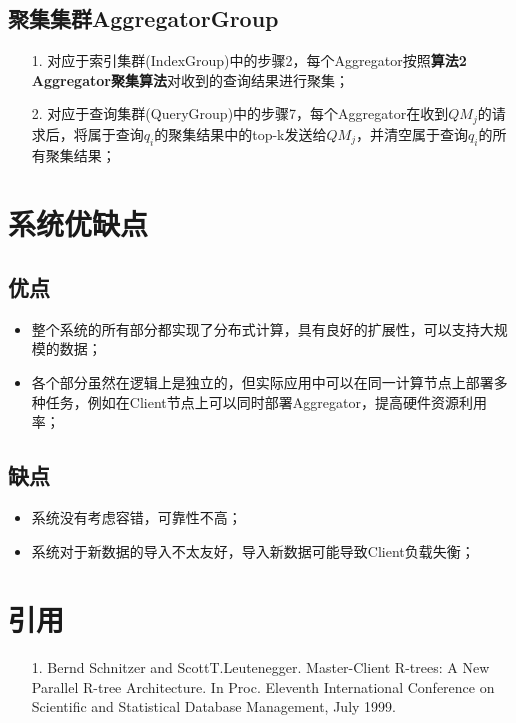 \documentclass{elegantpaper}
\begin{document}
\subsection{聚集集群AggregatorGroup}
\begin{itemize}
    \item[1.] 对应于索引集群(IndexGroup)中的步骤2，每个Aggregator按照{\bfseries 算法2 Aggregator聚集算法}对收到的查询结果进行聚集；
    \item[2.] 对应于查询集群(QueryGroup)中的步骤7，每个Aggregator在收到$QM_j$的请求后，将属于查询$q_i$的聚集结果中的top-k发送给$QM_j$，并清空属于查询$q_i$的所有聚集结果；
\end{itemize}

\section{系统优缺点}

\subsection{优点}

\begin{itemize}

    \item 整个系统的所有部分都实现了分布式计算，具有良好的扩展性，可以支持大规模的数据；
    
    \item 各个部分虽然在逻辑上是独立的，但实际应用中可以在同一计算节点上部署多种任务，例如在Client节点上可以同时部署Aggregator，提高硬件资源利用率；
    
\end{itemize}

\subsection{缺点}

\begin{itemize}

    \item 系统没有考虑容错，可靠性不高；

    \item 系统对于新数据的导入不太友好，导入新数据可能导致Client负载失衡；
    
\end{itemize}

\section{引用}

\begin{itemize}

    \item[1.] Bernd Schnitzer and ScottT.Leutenegger. Master-Client R-trees: A New Parallel R-tree Architecture. In Proc. Eleventh International Conference on Scientific and Statistical Database Management, July 1999.
    
\end{itemize}
\end{document}
